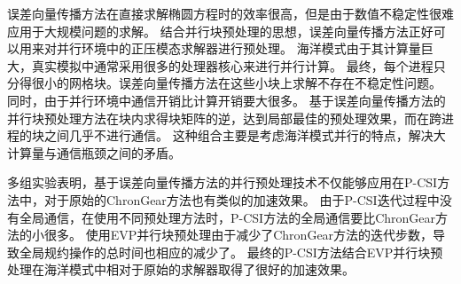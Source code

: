 误差向量传播方法在直接求解椭圆方程时的效率很高，但是由于数值不稳定性很难应用于大规模问题的求解。
结合并行块预处理的思想，误差向量传播方法正好可以用来对并行环境中的正压模态求解器进行预处理。
海洋模式由于其计算量巨大，真实模拟中通常采用很多的处理器核心来进行并行计算。
最终，每个进程只分得很小的网格块。误差向量传播方法在这些小块上求解不存在不稳定性问题。 
同时，由于并行环境中通信开销比计算开销要大很多。
基于误差向量传播方法的并行块预处理方法在块内求得块矩阵的逆，达到局部最佳的预处理效果，而在跨进程的块之间几乎不进行通信。
这种组合主要是考虑海洋模式并行的特点，解决大计算量与通信瓶颈之间的矛盾。


多组实验表明，基于误差向量传播方法的并行预处理技术不仅能够应用在P-CSI方法中，对于原始的ChronGear方法也有类似的加速效果。
由于P-CSI迭代过程中没有全局通信，在使用不同预处理方法时，P-CSI方法的全局通信要比ChronGear方法的小很多。
使用EVP并行块预处理由于减少了ChronGear方法的迭代步数，导致全局规约操作的总时间也相应的减少了。
最终的P-CSI方法结合EVP并行块预处理在海洋模式中相对于原始的求解器取得了很好的加速效果。